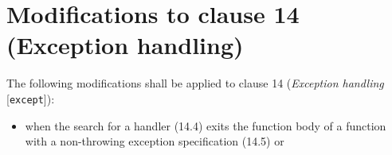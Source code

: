 \section{Modifications to clause 14 (Exception handling)}

The following modifications shall be applied to clause 14 (\emph{Exception
handling} [\texttt{except}]):

\begin{modification}

\begin{itemize}[label=\textemdash]

\item
when the search for a handler (14.4) exits the function body of a function with
a non-throwing exception specification (14.5)  or

\end{itemize}

\end{modification}
